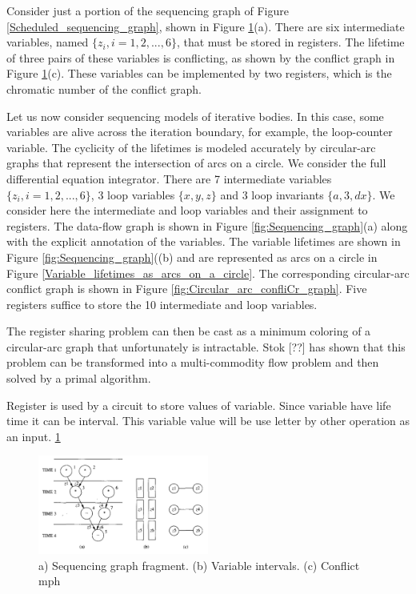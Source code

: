 Consider just a portion of the sequencing graph of Figure \ref{Scheduled_sequencing_graph}, shown in Figure \ref{fig:Sequencing_graph_fragment}(a). There are six intermediate variables, named $ \{z_{i},i=1,2,...,6\} $, that must be stored in registers. The lifetime of three pairs of these variables is conflicting, as shown by the conflict graph in Figure \ref{fig:Sequencing_graph_fragment}(c). These variables can be implemented by two registers, which is the chromatic number of the conflict graph.


Let us now consider sequencing models of iterative bodies. In this case, some variables are alive across the iteration boundary, for example, the loop-counter variable. The cyclicity of the lifetimes is modeled accurately by circular-arc graphs that represent the intersection of arcs on a circle. We consider the full differential equation integrator. There are 7 intermediate variables $ \{z_{i},i=1,2,...,6\} $, 3 loop variables $ \{x,y,z\} $ and 3 loop invariants  $ \{a,3,dx\} $. We consider here the intermediate and loop variables and their assignment to registers. The data-flow graph is shown in Figure \ref{fig:Sequencing_graph}(a) along with the explicit annotation of the variables. The variable lifetimes are shown in Figure  \ref{fig:Sequencing_graph}((b) and are represented as arcs on a circle in Figure \ref{Variable_lifetimes_as_arcs_on_a_circle}. The corresponding circular-arc conflict graph is shown in Figure \ref{fig:Circular_arc_confliCr_graph}. Five registers suffice to store the 10 intermediate and loop variables. 

The register sharing problem can then be cast as a minimum coloring of a circular-arc graph that unfortunately is intractable. Stok [??] has shown that this problem can be transformed into a multi-commodity flow problem and then solved by a primal algorithm.

Register is used by a circuit to store values of variable. Since variable have life time it can be interval. This variable value will be use letter by other operation as an input.
\ref{fig:Sequencing_graph_fragment}
\begin{figure}[h]
    \centering
    \includegraphics[width=0.5\textwidth]{Sequencing_graph_fragment}
    \caption{ a) Sequencing graph fragment. (b) Variable intervals. (c) Conflict mph \cite{b1}}
    \label{fig:Sequencing_graph_fragment}
\end{figure}

